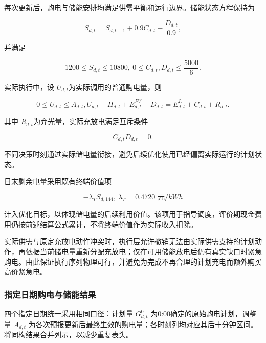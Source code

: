 \documentclass[withoutpreface,bwprint]{cumcmthesis}
\begin{document}
每次更新后，购电与储能安排均满足供需平衡和运行边界。储能状态方程保持为

\begin{equation}S_{d,t} = S_{d,t - 1} + 0.9C_{d,t} - \frac{D_{d,t}}{0.9},\end{equation}

并满足

\begin{equation}1200 \leq S_{d,t} \leq 10800,\ 0 \leq C_{d,t},D_{d,t} \leq \frac{5000}{6}.\end{equation}

实际执行中，设 \(U_{d,t}\)为实际调用的普通购电量，则

\begin{equation}{0 \leq U_{d,t} \leq A_{d,t},
}{U_{d,t} + H_{d,t} + E_{d,t}^{PV} + D_{d,t} = E_{d,t}^{L} + C_{d,t} + R_{d,t}.}\end{equation}

其中 \(R_{d,t}\)为弃光量，实际充放电满足互斥条件

\begin{equation}C_{d,t}D_{d,t} = 0.\end{equation}

不同决策时刻通过实际储电量衔接，避免后续优化使用已经偏离实际运行的计划状态。

日末剩余电量采用既有终端价值项

\begin{equation}- \lambda_{T}S_{d,144},\ \lambda_{T} = 0.4720\text{~元}/kWh\end{equation}

计入优化目标，以体现储电量的后续利用价值。该项用于指导调度，评价期现金费用仍按前述结算公式累计，不将终端价值作为实际收入扣除。

实际供需与原定充放电动作冲突时，执行层允许撤销无法由实际供需支持的计划动作，再依据当前储电量重新分配充放电；仅在可用储能放电后仍有真实缺口时紧急购电。由此保证执行序列物理可行，并避免为完成不再合理的计划充电而额外购买高价紧急电。

\subsubsection{指定日期购电与储能结果}

四个指定日期统一采用相同口径：计划量 \(G_{d,t}^{0}\) 为0:00确定的原始购电计划，调整量
\(A_{d,t}\) 为各次预报更新后最终生效的购电量；各时刻列均对应其后十分钟区间。将同构结果合并列示，以减少重复表头。
\end{document}
